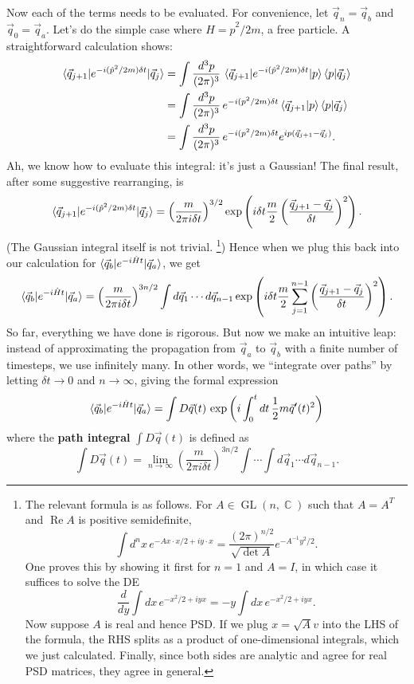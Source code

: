 \documentclass{report}
\theoremstyle{plain}
\theoremstyle{definition}
\theoremstyle{remark}
\DeclareMathOperator{\bC}{\mathbb{C}}
\DeclareMathOperator{\re}{Re}
\DeclareMathOperator{\GL}{GL}
\begin{document}
Now each of the terms needs to be evaluated. For convenience, let
$\vec{q}_n = \vec{q}_b$ and $\vec{q}_0 = \vec{q}_a$. Let's do the
simple case where $\hat{H} = \hat{p}^2/2m$, a free particle. A
straightforward calculation shows:
\begin{align*}
  \braket{\vec{q}_{j+1}|e^{-i(\hat{p}^2/2m)\delta t}|\vec{q}_j}
  &= \int \frac{d^3p}{(2\pi)^3} \, \braket{\vec{q}_{j+1}|e^{-i(\hat{p}^2/2m)\delta t}|p}\braket{p|\vec{q}_j} \\
  &= \int \frac{d^3p}{(2\pi)^3} \, e^{-i(p^2/2m)\delta t} \braket{\vec{q}_{j+1}|p}\braket{p|\vec{q}_j} \\
  &= \int \frac{d^3p}{(2\pi)^3} \, e^{-i(p^2/2m)\delta t} e^{ip(\vec{q}_{j+1} - \vec{q}_j)}.
\end{align*}
Ah, we know how to evaluate this integral: it's just a Gaussian! The
final result, after some suggestive rearranging, is
$$ \braket{\vec{q}_{j+1}|e^{-i(\hat{p}^2/2m)\delta t}|\vec{q}_j} = \left(\frac{m}{2\pi i\delta t}\right)^{3/2} \exp\left(i\delta t \frac{m}{2}\left(\frac{\vec{q}_{j+1} - \vec{q}_j}{\delta t}\right)^2\right). $$
(The Gaussian integral itself is not trivial. \footnote{The relevant
formula is as follows. For $A \in \GL(n, \bC)$ such that $A = A^T$
and $\re A$ is positive semidefinite,
$$ \int d^nx \, e^{-Ax \cdot x/2 + iy \cdot x} = \frac{(2\pi)^{n/2}}{\sqrt{\det A}} e^{-A^{-1} y^2/2}. $$ 
One proves this by showing it first for $n = 1$ and $A = I$, in which
case it suffices to solve the DE
$$ \frac{d}{dy} \int dx \, e^{-x^2/2 + iyx} = -y \int dx \, e^{-x^2/2 + iyx}. $$
Now suppose $A$ is real and hence PSD. If we plug $x = \sqrt{A}v$ into
the LHS of the formula, the RHS splits as a product of one-dimensional
integrals, which we just calculated. Finally, since both sides are
analytic and agree for real PSD matrices, they agree in general.})
Hence when we plug this back into our calculation for
$\braket{\vec{q}_b|e^{-i\hat{H}t}|\vec{q}_a}$, we get
$$ \braket{\vec{q}_b|e^{-i\hat{H}t}|\vec{q}_a} = \left(\frac{m}{2\pi i\delta t}\right)^{3n/2} \int d\vec{q}_1 \cdots d\vec{q}_{n-1} \exp\left(i\delta t \frac{m}{2}\sum_{j=1}^{n-1} \left(\frac{\vec{q}_{j+1} - \vec{q}_j}{\delta t}\right)^2\right). $$
So far, everything we have done is rigorous. But now we make an
intuitive leap: instead of approximating the propagation from
$\vec{q}_a$ to $\vec{q}_b$ with a finite number of timesteps, we use
infinitely many. In other words, we ``integrate over paths'' by
letting $\delta t \to 0$ and $n \to \infty$, giving the formal
expression
$$ \braket{\vec{q}_b|e^{-i\hat{H}t}|\vec{q}_a} = \int D\vec{q}(t) \, \exp\left(i \int_0^t dt \, \frac{1}{2} m \vec{q}'(t)^2\right) $$
where the {\bf path integral} $\int D\vec{q}(t)$ is defined as
$$ \int D\vec{q}(t) = \lim_{n \to \infty} \left(\frac{m}{2\pi i\delta t}\right)^{3n/2} \int \cdots \int d\vec{q}_1 \cdots d\vec{q}_{n-1}. $$
\end{document}
